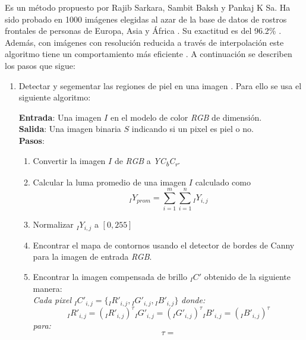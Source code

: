 \documentclass[a4paper,openright,12pt]{report}
\begin{document}
Es un método propuesto por Rajib Sarkara, Sambit Baksh y Pankaj K Sa. Ha sido
probado en 1000 imágenes elegidas al azar de la base de datos de rostros
frontales de personas de Europa, Asia y África \cite{sarkar2012real}.
Su exactitud es del 96.2\% \cite{sarkar2012real}.
Además, con imágenes con resolución reducida a través de interpolación este
algoritmo tiene un comportamiento más eficiente \cite{sarkar2012real}.
A continuación se describen los pasos que sigue:
\begin{enumerate}[label=(\alph*)]
    \item Detectar y segementar las regiones de piel en una imagen
        \cite{sarkar2012real}. Para ello se usa el siguiente algoritmo:
    \begin{framed}
    \textbf{Entrada}: Una imagen $I$ en el modelo de color \textit{RGB} de
    dimensión.\\
    \textbf{Salida}: Una imagen binaria $S$ indicando si un pixel es piel o no.\\
    \textbf{Pasos}:\\
        \begin{enumerate}[label=\arabic*.]
            \item Convertir la imagen $I$ de \textit{RGB} a
                \textit{YC\textsubscript{b}C\textsubscript{r}}.
            \item Calcular la luma promedio de una imagen $I$ calculado como
                \[
                    {}_{I}Y_{prom} = {\sum_{i=1}^{m}\sum_{i=1}^{n} {}_{I}Y_{i,j}} 
                \]
            \item Normalizar ${}_{I}Y_{i,j}$ a ${[0,255]}$
            \item Encontrar el mapa de contornos usando el detector de bordes de
                Canny para la imagen de entrada \textit{RGB}.
            \item Encontrar la imagen compensada de brillo ${}_{I}C'$ obtenido
                de la siguiente manera:\\
                \textit{Cada pixel}
                    ${}_{I}C'_{i,j} = \{{}_{I}R'_{i,j}, {}_{I}G'_{i,j}, {}_{I}B'_{i,j}\}$
                \textit{donde:}\\
                \[
                    {}_{I}R'_{i,j} = ({}_{I}R'_{i,j})^\tau
                    {}_{I}G'_{i,j} = ({}_{I}G'_{i,j})^\tau
                    {}_{I}B'_{i,j} = ({}_{I}B'_{i,j})^\tau
                \]
                \textit{para:}
                \begin{equation}
                    \tau=

\end{equation}
\end{enumerate}
\end{framed}
\end{enumerate}
\end{document}
